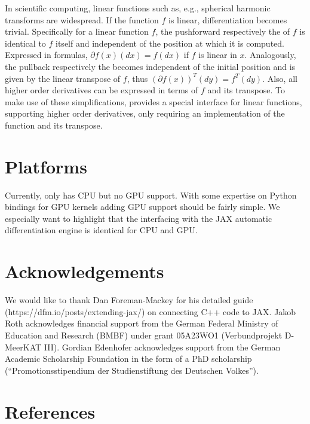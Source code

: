 \documentclass[10pt,a4paper,onecolumn]{article}
\let\textttOrig=\texttt
\def\texttt#1{\expandafter\textttOrig{\seqsplit{#1}}}
\begin{document}
In scientific computing, linear functions such as, e.g., spherical
harmonic transforms are widespread. If the function \(f\) is linear,
differentiation becomes trivial. Specifically for a linear function
\(f\), the pushforward respectively the \texttt{jvp} of \(f\) is
identical to \(f\) itself and independent of the position at which it is
computed. Expressed in formulas, \(\partial f(x)(dx) = f(dx)\) if \(f\)
is linear in \(x\). Analogously, the pullback respectively the
\texttt{vjp} becomes independent of the initial position and is given by
the linear transpose of \(f\), thus
\((\partial f(x))^{T}(dy) = f^T(dy)\). Also, all higher order
derivatives can be expressed in terms of \(f\) and its transpose. To
make use of these simplifications, \texttt{JAXbind} provides a special
interface for linear functions, supporting higher order derivatives,
only requiring an implementation of the function and its transpose.

\hypertarget{platforms}{%
\section{Platforms}\label{platforms}}

Currently, \texttt{JAXbind} only has CPU but no GPU support. With some
expertise on Python bindings for GPU kernels adding GPU support should
be fairly simple. We especially want to highlight that the interfacing
with the JAX automatic differentiation engine is identical for CPU and
GPU.

\hypertarget{acknowledgements}{%
\section{Acknowledgements}\label{acknowledgements}}

We would like to thank Dan Foreman-Mackey for his detailed guide
(https://dfm.io/posts/extending-jax/) on connecting C++ code to JAX.
Jakob Roth acknowledges financial support from the German Federal
Ministry of Education and Research (BMBF) under grant 05A23WO1
(Verbundprojekt D-MeerKAT III). Gordian Edenhofer acknowledges support
from the German Academic Scholarship Foundation in the form of a PhD
scholarship (``Promotionsstipendium der Studienstiftung des Deutschen
Volkes'').

\hypertarget{references}{%
\section{References}\label{references}}
\end{document}
